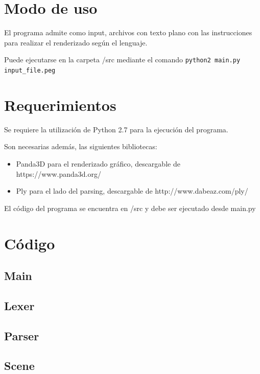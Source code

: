 \documentclass[a4paper, 10pt, twoside]{article}
\begin{document}
\section{Modo de uso}

El programa admite como input, archivos con texto plano con las instrucciones para realizar el renderizado según el lenguaje.

Puede ejecutarse en la carpeta /src mediante el comando \verb+python2 main.py input_file.peg+

\section{Requerimientos}
Se requiere la utilización de Python 2.7 para la ejecución del programa.

Son necesarias además, las siguientes bibliotecas:
\begin{itemize}
\item Panda3D para el renderizado gráfico, descargable de https://www.panda3d.org/
\item Ply para el lado del parsing, descargable de http://www.dabeaz.com/ply/
\end{itemize}

El código del programa se encuentra en /src y debe ser ejecutado desde main.py

\section{Código}

\subsection{Main}

\begin{small}

\end{small}


\subsection{Lexer}

\begin{small}

\end{small}

\subsection{Parser}

\begin{small}

\end{small}

\subsection{Scene}

\begin{small}

\end{small}
\end{document}

